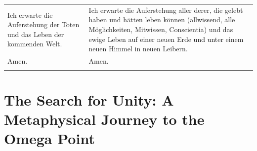 \documentclass[
  ngerman,
]{article}
\begin{document}
\begin{longtable}[]{@{}
  >{\raggedright\arraybackslash}p{}
  >{\raggedright\arraybackslash}p{}@{}}
\begin{minipage}[b]{\linewidth}
Ich erwarte die Auferstehung der Toten und das Leben der kommenden Welt.
\end{minipage} & \begin{minipage}[b]{\linewidth}\raggedright
Ich erwarte die Auferstehung aller derer, die gelebt haben und hätten
leben können (allwissend, alle Möglichkeiten, Mitwissen, Conscientia)
und das ewige Leben auf einer neuen Erde und unter einem neuen Himmel in
neuen Leibern.
\end{minipage} \\
\begin{minipage}[b]{\linewidth}\raggedright
Amen.
\end{minipage} & \begin{minipage}[b]{\linewidth}\raggedright
Amen.
\end{minipage} \\
\midrule\noalign{}
\endhead
\bottomrule\noalign{}
\endlastfoot
\end{longtable}

\section{\texorpdfstring{\textbf{The Search for Unity: A Metaphysical
Journey to the Omega
Point}}{The Search for Unity: A Metaphysical Journey to the Omega Point}}\label{the-search-for-unity-a-metaphysical-journey-to-the-omega-point}
\end{document}
